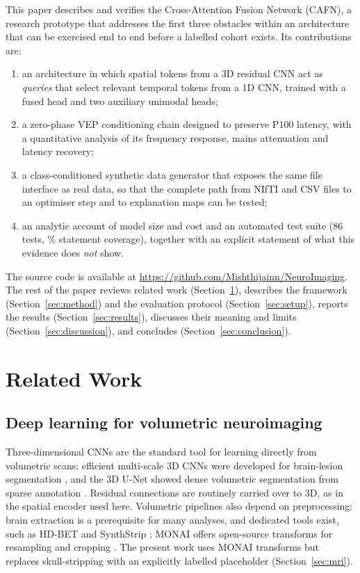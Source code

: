 \documentclass{ieeeaccessapprox}
\begin{document}
This paper describes and verifies the Cross-Attention Fusion Network (CAFN), a research prototype that addresses the first three obstacles within an architecture that can be exercised end to end before a labelled cohort exists. Its contributions are:
\begin{enumerate}
\item an architecture in which spatial tokens from a 3D residual CNN act as \emph{queries} that select relevant temporal tokens from a 1D CNN, trained with a fused head and two auxiliary unimodal heads;
\item a zero-phase VEP conditioning chain designed to preserve P100 latency, with a quantitative analysis of its frequency response, mains attenuation and latency recovery;
\item a class-conditioned synthetic data generator that exposes the same file interface as real data, so that the complete path from NIfTI and CSV files to an optimiser step and to explanation maps can be tested;
\item an analytic account of model size and cost and an automated test suite (86 tests, \covTotal\% statement coverage), together with an explicit statement of what this evidence does \emph{not} show.
\end{enumerate}
The source code is available at \url{https://github.com/Mishthijainn/NeuroImaging}. The rest of the paper reviews related work (Section~\ref{sec:related}), describes the framework (Section~\ref{sec:method}) and the evaluation protocol (Section~\ref{sec:setup}), reports the results (Section~\ref{sec:results}), discusses their meaning and limits (Section~\ref{sec:discussion}), and concludes (Section~\ref{sec:conclusion}).

\section{Related Work}\label{sec:related}
\subsection{Deep learning for volumetric neuroimaging}
Three-dimensional CNNs are the standard tool for learning directly from volumetric scans: efficient multi-scale 3D CNNs were developed for brain-lesion segmentation \cite{kamnitsas2017}, and the 3D U-Net showed dense volumetric segmentation from sparse annotation \cite{cicek2016}. Residual connections \cite{he2016} are routinely carried over to 3D, as in the spatial encoder used here. Volumetric pipelines also depend on preprocessing: brain extraction is a prerequisite for many analyses, and dedicated tools exist, such as HD-BET \cite{isensee2019} and SynthStrip \cite{hoopes2022}; MONAI offers open-source transforms for resampling and cropping \cite{cardoso2022}. The present work uses MONAI transforms but replaces skull-stripping with an explicitly labelled placeholder (Section~\ref{sec:mri}).
\end{document}
